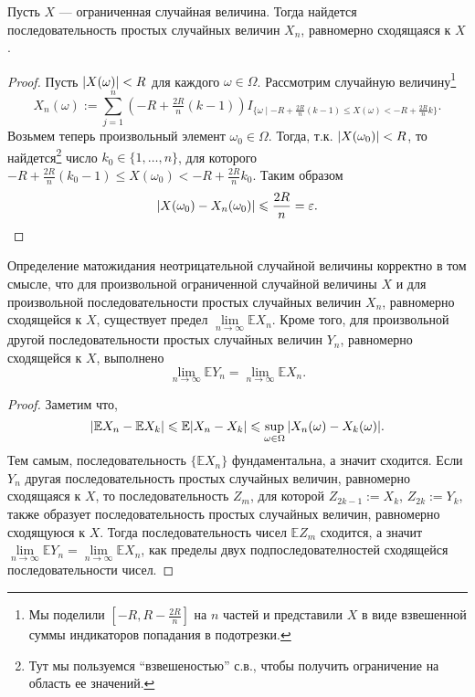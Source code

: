 \begin{lemma*}
    Пусть $X$ --- ограниченная случайная величина.
    Тогда найдется последовательность простых случайных величин $X_n$, равномерно сходящаяся к $X$.
\end{lemma*}

\begin{proof}
    Пусть $\abs{X(\omega)} < R$ для каждого $\omega \in \Omega$.
    Рассмотрим случайную величину\footnote{Мы поделили $[-R, R - \frac{2R}{n}]$ на $n$ частей и представили $X$ в виде взвешенной суммы индикаторов попадания в подотрезки.}
    \[
        X_n(\omega) := \sum_{j = 1}^{n}(-R + \tfrac{2R}{n}(k - 1)) I_{\{\omega \mid -R + \frac{2R}{n}(k - 1) \leqslant X(\omega)< -R + \frac{2R}{n} k\}}.
    \]
    Возьмем теперь произвольный элемент $\omega_0 \in \Omega$.
    Тогда, т.к. $\abs{X(\omega_0)} < R$, то найдется\footnote{Тут мы пользуемся \enquote{взвешеностью} с.в., чтобы получить ограничение на область ее значений.} число $k_0 \in \{1, \ldots, n \}$, для которого $-R + \frac{2R}{n}(k_0 - 1) \leqslant X(\omega_0) < -R + \frac{2R}{n} k_0$.
    Таким образом
    \[
        \abs{X(\omega_0) - X_n(\omega_0)} \leqslant \frac{2R}{n} = \varepsilon.
    \]
\end{proof}

\begin{proposal*}
    Определение матожидания неотрицательной случайной величины корректно в том смысле, что для произвольной ограниченной случайной величины $X$ и для произвольной последовательности простых случайных величин $X_n$, равномерно сходящейся к $X$, существует предел $\lim\limits_{n \to \infty} \mathbb{E} X_n$.
    Кроме того, для произвольной другой последовательности простых случайных величин $Y_n$, равномерно сходящейся к $X$, выполнено
    \[
        \lim\limits_{n \to \infty}\mathbb{E} Y_n = \lim\limits_{n \to \infty}\mathbb{E} X_n.
    \]
\end{proposal*}

\begin{proof}
    Заметим что,
    \[
        \abs{\mathbb{E} X_n - \mathbb{E} X_k} \leqslant \mathbb{E}\abs{X_n - X_k} \leqslant \sup\limits_{\omega \in \Omega}\abs{X_n(\omega) - X_k(\omega)}.
    \]
    Тем самым, последовательность $\{\mathbb{E}X_n\}$ фундаментальна, а значит сходится. Если $Y_n$ другая последовательность простых случайных величин, равномерно сходящаяся к $X$, то последовательность $Z_m$, для которой $Z_{2k - 1} := X_k$, $Z_{2k} := Y_k$, также образует последовательность простых случайных величин, равномерно сходящуюся к $X$.
    Тогда последовательность чисел $\mathbb{E}Z_m$ сходится, а значит $\lim\limits_{n \to \infty}\mathbb{E} Y_n = \lim\limits_{n \to \infty}\mathbb{E} X_n$, как пределы двух подпоследователностей сходящейся последовательности чисел.
\end{proof}

